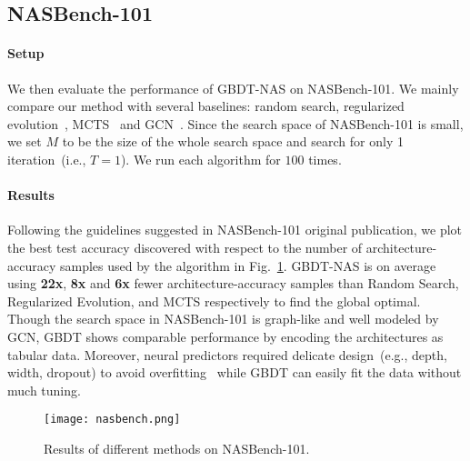 \documentclass{article}
\begin{document}
\subsection{NASBench-101}
\paragraph{Setup} 
We then evaluate the performance of GBDT-NAS on NASBench-101. We mainly compare our method with several baselines: random search, regularized evolution~\cite{amoebanet}, MCTS~\cite{mctsnas} and GCN~\cite{neuralpredictor}. Since the search space of NASBench-101 is small, we set $M$ to be the size of the whole search space and search for only 1 iteration~(i.e., $T=1$). We run each algorithm for $100$ times.

\paragraph{Results} Following the guidelines suggested in NASBench-101 original publication, we plot the best test accuracy discovered with respect to the number of architecture-accuracy samples used by the algorithm in Fig.~\ref{fig:nasbench}. GBDT-NAS is on average using
\textbf{22x}, \textbf{8x} and \textbf{6x} fewer architecture-accuracy samples than Random Search, Regularized Evolution, and MCTS respectively to find the global optimal. Though the search space in NASBench-101 is graph-like and well modeled by GCN, GBDT shows comparable performance by encoding the architectures as tabular data. Moreover, neural predictors required delicate design~(e.g., depth, width, dropout) to avoid overfitting~\cite{neuralpredictor} while GBDT can easily fit the data without much tuning.

\begin{figure}[htbp]
\vspace{-10pt}
\centering
\texttt{[image: nasbench.png]}
\caption{Results of different methods on NASBench-101.}
\label{fig:nasbench}
\end{figure}
\end{document}
